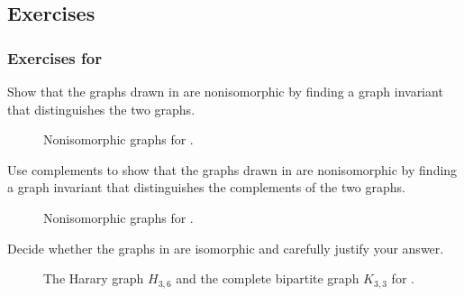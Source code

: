 
\subsection{Exercises}


\subsubsection*{Exercises for 
\subnonisograph}

\begin{exer}[\exerP] %
\label{exer_show_nonism_Ham5}
    Show that the graphs drawn in  are nonisomorphic by finding a graph invariant that distinguishes the two graphs.
        \begin{figure}[hbtp]
            \centering
            
            \caption{Nonisomorphic graphs for .}
                \label{fig_nonism_Ham5}
        \end{figure}
\end{exer}

\begin{exer}[\exerP] %
\label{exer_show_nonism_H3b6}
    Use complements to show that the graphs drawn in  are nonisomorphic by finding a graph invariant that distinguishes the complements of the two graphs.
        \begin{figure}[hbtp]
            \centering
            
            \caption{Nonisomorphic graphs for .}
                \label{fig_nonism_H3b6}
        \end{figure}
\end{exer}

\begin{exer}[\exerP] %
\label{exer_show_ism_H3b6_K3b3}
    Decide whether the graphs in  are isomorphic and carefully justify your answer.
        \begin{figure}[hbtp]
            \centering
            
            \caption{The Harary graph $H_{3,6}$ and the complete bipartite graph $K_{3,3}$ for .}
            \label{fig_ism_H3b6_K3b3}
        \end{figure}    
\end{exer}

